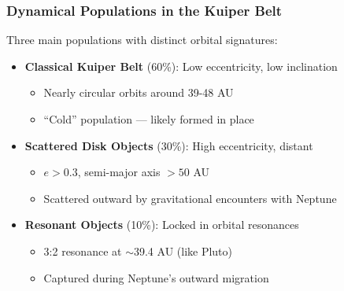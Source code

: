 \documentclass[aspectratio=169]{beamer}
\begin{document}
\begin{frame}
    \frametitle{Dynamical Populations in the Kuiper Belt}
    Three main populations with distinct orbital signatures:
    \begin{itemize}
        \item \textbf{Classical Kuiper Belt} (60\%): Low eccentricity, low inclination \pause
              \begin{itemize}
                  \item Nearly circular orbits around 39-48 AU \pause
                  \item ``Cold'' population — likely formed in place \pause
              \end{itemize}
        \item \textbf{Scattered Disk Objects} (30\%): High eccentricity, distant \pause
              \begin{itemize}
                  \item $e > 0.3$, semi-major axis $> 50$ AU \pause
                  \item Scattered outward by gravitational encounters with Neptune \pause
              \end{itemize}
        \item \textbf{Resonant Objects} (10\%): Locked in orbital resonances \pause
              \begin{itemize}
                  \item 3:2 resonance at $\sim$39.4 AU (like Pluto) \pause
                  \item Captured during Neptune's outward migration \pause
              \end{itemize}
    \end{itemize}
\end{frame}
\end{document}
